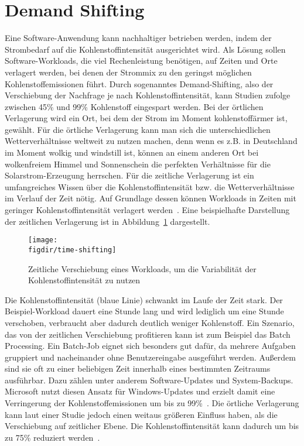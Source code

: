 \section{Demand Shifting}
Eine Software-Anwendung kann nachhaltiger betrieben werden, indem der Strombedarf auf die Kohlenstoffintensität ausgerichtet wird.
Als Lösung sollen Software-Workloads, die viel Rechenleistung benötigen, auf Zeiten und Orte verlagert werden, bei denen der Strommix zu den geringst möglichen Kohlenstoffemissionen führt.
Durch sogenanntes Demand-Shifting, also der Verschiebung der Nachfrage je nach Kohlenstoffintensität, kann Studien zufolge zwischen 45\% und 99\% Kohlenstoff eingespart werden.
Bei der örtlichen Verlagerung wird ein Ort, bei dem der Strom im Moment \glqq kohlenstoffärmer\grqq{} ist, gewählt.
Für die örtliche Verlagerung kann man sich die unterschiedlichen Wetterverhältnisse weltweit zu nutzen machen, denn wenn es z.B. in Deutschland im Moment wolkig und windstill ist, können an einem anderen Ort bei wolkenfreiem Himmel und Sonnenschein die perfekten Verhältnisse für die Solarstrom-Erzeugung herrschen.
Für die zeitliche Verlagerung ist ein umfangreiches Wissen über die Kohlenstoffintensität bzw. die Wetterverhältnisse im Verlauf der Zeit nötig.
Auf Grundlage dessen können Workloads in Zeiten mit geringer Kohlenstoffintensität verlagert werden~\cite{GreenSoftwareFoundation.2022}.
Eine beispielhafte Darstellung der zeitlichen Verlagerung ist in Abbildung~\ref{FIG:time-shifting} dargestellt.
\begin{figure}
 \caption[Zeitliche Verschiebung eines Workloads]{Zeitliche Verschiebung eines Workloads, um die Variabilität der Kohlenstoffintensität zu nutzen~\cite{Currie.2024}}
 {\texttt{[image: \\figdir/time-shifting]}}
 \label{FIG:time-shifting}
\end{figure}
Die Kohlenstoffintensität (blaue Linie) schwankt im Laufe der Zeit stark.
Der Beispiel-Workload dauert eine Stunde lang und wird lediglich um eine Stunde verschoben, verbraucht aber dadurch deutlich weniger Kohlenstoff.
Ein Szenario, das von der zeitlichen Verschiebung profitieren kann ist zum Beispiel das Batch Processing.
Ein Batch-Job eignet sich besonders gut dafür, da mehrere Aufgaben gruppiert und nacheinander ohne Benutzereingabe ausgeführt werden.
Außerdem sind sie oft zu einer beliebigen Zeit innerhalb eines bestimmten Zeitraums ausführbar.
Dazu zählen unter anderem Software-Updates und System-Backups.
Microsoft nutzt diesen Ansatz für Windows-Updates und erzielt damit eine Verringerung der Kohlenstoffemissionen um bis zu 99\%~\cite{Currie.2024}.
Die örtliche Verlagerung kann laut einer Studie jedoch einen weitaus größeren Einfluss haben, als die Verschiebung auf zeitlicher Ebene.
Die Kohlenstoffintensität kann dadurch um bis zu 75\% reduziert werden~\cite{Dodge.06212022}.

